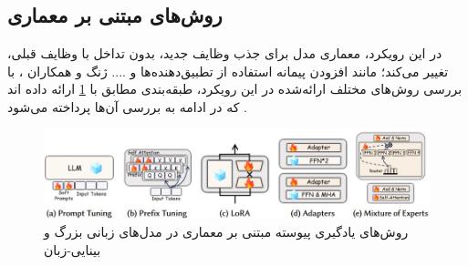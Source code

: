 \subsection{روش‌های مبتنی بر معماری}
در این رویکرد، معماری مدل برای جذب وظایف جدید، بدون تداخل با وظایف قبلی، تغییر می‌کند؛ مانند افزودن پیمانه
 استفاده از تطبیق‌دهنده‌ها و .... 
 ژنگ و همکاران
\cite{llm_continual}،
با بررسی روش‌های مختلف ارائه‌شده در این رویکرد، طبقه‌بندی مطابق با 
\cref{fig.22}
ارائه داده اند که در ادامه به بررسی آن‌ها پرداخته‌ می‌شود
.
\begin{figure}
\centering\includegraphics[scale=.75]{Images/Chapter2/llm_architec_methods.jpg}
\caption[روش‌های یادگیری پیوسته مبتنی بر معماری در مدل‌های زبانی بزرگ و بینایی-زبان ]{ روش‌های یادگیری پیوسته مبتنی بر معماری در مدل‌های زبانی بزرگ و بینایی-زبان \protect\cite{llm_continual}}
\label{fig.22}
\end{figure}

